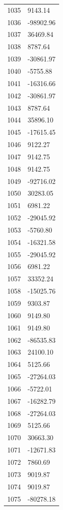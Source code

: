 \documentclass[a4paper,11pt]{article}
\begin{document}
\begin{center}
\begin{longtable}{|R{1.5cm}|R{2.6cm}|}
 1035 &      9143.14 \\
 1036 &    -98902.96 \\
 1037 &     36469.84 \\
 1038 &      8787.64 \\
 1039 &    -30861.97 \\
 1040 &     -5755.88 \\
 1041 &    -16316.66 \\
 1042 &    -30861.97 \\
 1043 &      8787.64 \\
 1044 &     35896.10 \\
 1045 &    -17615.45 \\
 1046 &      9122.27 \\
 1047 &      9142.75 \\
 1048 &      9142.75 \\
 1049 &    -92716.02 \\
 1050 &     30283.05 \\
 1051 &      6981.22 \\
 1052 &    -29045.92 \\
 1053 &     -5760.80 \\
 1054 &    -16321.58 \\
 1055 &    -29045.92 \\
 1056 &      6981.22 \\
 1057 &     33352.24 \\
 1058 &    -15025.76 \\
 1059 &      9303.87 \\
 1060 &      9149.80 \\
 1061 &      9149.80 \\
 1062 &    -86535.83 \\
 1063 &     24100.10 \\
 1064 &      5125.66 \\
 1065 &    -27264.03 \\
 1066 &     -5722.01 \\
 1067 &    -16282.79 \\
 1068 &    -27264.03 \\
 1069 &      5125.66 \\
 1070 &     30663.30 \\
 1071 &    -12671.83 \\
 1072 &      7860.69 \\
 1073 &      9019.87 \\
 1074 &      9019.87 \\
 1075 &    -80278.18 \\

\end{longtable}
\end{center}
\end{document}
